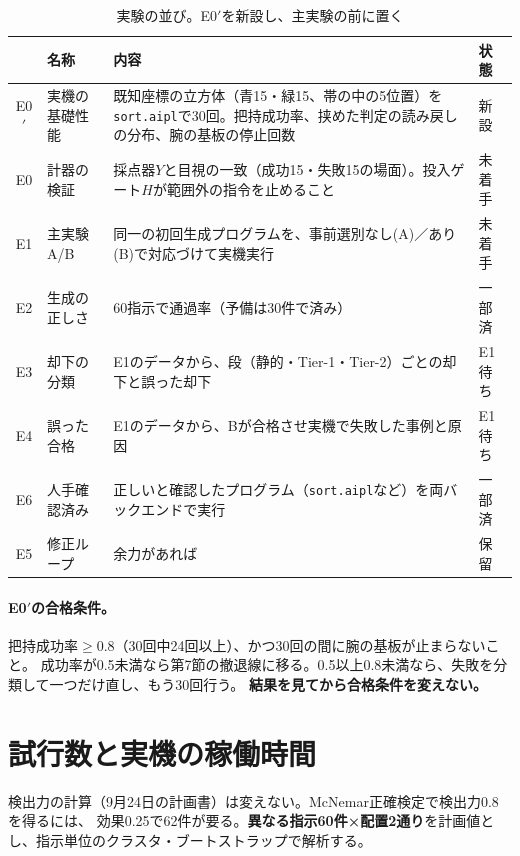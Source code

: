 \documentclass[11pt,a4paper]{article}
\begin{document}
\begin{table}[h]\centering\small
\caption{実験の並び。E0$'$を新設し、主実験の前に置く}
\begin{tabularx}{\textwidth}{@{}clYl@{}}
\toprule
& 名称 & 内容 & 状態 \\
\midrule
E0$'$ & 実機の基礎性能 & 既知座標の立方体（青15・緑15、帯の中の5位置）を\texttt{sort.aipl}で30回。把持成功率、挟めた判定の読み戻しの分布、腕の基板の停止回数 & 新設 \\
E0 & 計器の検証 & 採点器$Y$と目視の一致（成功15・失敗15の場面）。投入ゲート$H$が範囲外の指令を止めること & 未着手 \\
E1 & 主実験A/B & 同一の初回生成プログラムを、事前選別なし(A)／あり(B)で対応づけて実機実行 & 未着手 \\
E2 & 生成の正しさ & 60指示で通過率（予備は30件で済み） & 一部済 \\
E3 & 却下の分類 & E1のデータから、段（静的・Tier-1・Tier-2）ごとの却下と誤った却下 & E1待ち \\
E4 & 誤った合格 & E1のデータから、Bが合格させ実機で失敗した事例と原因 & E1待ち \\
E6 & 人手確認済み & 正しいと確認したプログラム（\texttt{sort.aipl}など）を両バックエンドで実行 & 一部済 \\
E5 & 修正ループ & 余力があれば & 保留 \\
\bottomrule
\end{tabularx}
\end{table}

\paragraph{E0$'$の合格条件。}把持成功率$\ge0.8$（30回中24回以上）、かつ30回の間に腕の基板が止まらないこと。
成功率が0.5未満なら第7節の撤退線に移る。0.5以上0.8未満なら、失敗を分類して一つだけ直し、もう30回行う。
\textbf{結果を見てから合格条件を変えない。}

\section{試行数と実機の稼働時間}

検出力の計算（9月24日の計画書）は変えない。McNemar正確検定で検出力0.8を得るには、
効果0.25で62件が要る。\textbf{異なる指示60件×配置2通り}を計画値とし、指示単位のクラスタ・ブートストラップで解析する。
\end{document}
